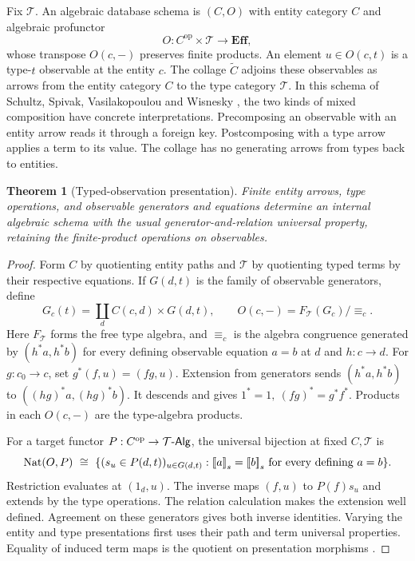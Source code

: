 \documentclass[11pt,a4paper]{article}
\newtheorem{theorem}{Theorem}[section]
\theoremstyle{definition}
\theoremstyle{remark}\newaliascnt{remark}{theorem}
\providecommand{\llbracket}{\mathopen{[\mkern-3mu[}}
\providecommand{\rrbracket}{\mathclose{]\mkern-3mu]}}
\newcommand{\E}{\mathbf{Eff}}
\numberwithin{equation}{section}
\begin{document}
Fix $\mathcal T$. An algebraic database schema is $(C,O)$ with entity category $C$ and algebraic profunctor
\begin{equation}\label{eq:database-schema}
 O:C^{\mathrm{op}}\times\mathcal T\longrightarrow\E,
\end{equation}
whose transpose $O(c,-)$ preserves finite products. An element $u\in O(c,t)$ is a type-$t$ observable at the entity $c$. The collage $\widetilde C$ adjoins these observables as arrows from the entity category $C$ to the type category $\mathcal T$.
In this schema of Schultz, Spivak, Vasilakopoulou and Wisnesky \cite{algebraic-databases,algebraic-databases-errata}, the two kinds of mixed composition have concrete interpretations. Precomposing an observable with an entity arrow reads it through a foreign key. Postcomposing with a type arrow applies a term to its value. The collage has no generating arrows from types back to entities.

\begin{theorem}[Typed-observation presentation]\label{thm:schema-presentation}
Finite entity arrows, type operations, and observable generators and equations determine an internal algebraic schema with the usual generator-and-relation universal property, retaining the finite-product operations on observables.
\end{theorem}
\begin{proof}
Form \(C\) by quotienting entity paths and \(\mathcal T\) by quotienting typed terms by their respective equations. If \(G(d,t)\) is the family of observable generators, define
\[
 G_c(t)=\coprod_d C(c,d)\times G(d,t),\qquad
 O(c,-)=F_{\mathcal T}(G_c)/{\equiv_c}.
\]
Here \(F_{\mathcal T}\) forms the free type algebra, and \(\equiv_c\) is the algebra congruence generated by \((h^*a,h^*b)\) for every defining observable equation \(a=b\) at \(d\) and \(h:c\to d\). For \(g:c_0\to c\), set \(g^*(f,u)=(fg,u)\). Extension from generators sends \((h^*a,h^*b)\) to \(((hg)^*a,(hg)^*b)\). It descends and gives \(1^*=1,\ (fg)^*=g^*f^*\). Products in each \(O(c,-)\) are the type-algebra products.

For a target functor \(P:C^{\rm op}\to\mathcal T\text{-}\mathsf{Alg}\), the universal bijection at fixed \(C,\mathcal T\) is
\[
 \operatorname{Nat}(O,P)
 \ \cong\ \{(s_u\in P(d,t))_{u\in G(d,t)}:
            \llbracket a\rrbracket_s=\llbracket b\rrbracket_s
                         \text{ for every defining }a=b\}.
\]
Restriction evaluates at \((1_d,u)\). The inverse maps \((f,u)\) to \(P(f)s_u\) and extends by the type operations. The relation calculation makes the extension well defined. Agreement on these generators gives both inverse identities. Varying the entity and type presentations first uses their path and term universal properties. Equality of induced term maps is the quotient on presentation morphisms \cite{algebraic-databases-errata}.
\end{proof}
\end{document}
